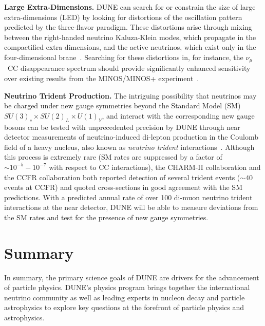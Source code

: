 {\bf Large Extra-Dimensions.}
DUNE can search for or constrain the size of large extra-dimensions (LED) by looking for distortions of the oscillation pattern predicted by the three-flavor paradigm. These distortions arise through mixing between the right-handed neutrino Kaluza-Klein modes, which propagate in the compactified extra dimensions, and the active neutrinos, which exist only in the four-dimensional brane~\cite{Dvali:1999cn}. Searching for these distortions in, for instance, the $\nu_\mu$~CC disappearance spectrum should provide significantly enhanced sensitivity over existing results from the MINOS/MINOS+ experiment~\cite{Adamson:2016yvy}.

{\bf Neutrino Trident Production.}
The intriguing possibility that neutrinos may be charged under new gauge symmetries beyond the Standard Model (SM) $SU(3)_c\times SU(2)_L\times U(1)_Y$, and interact with the corresponding new gauge bosons can be tested with unprecedented precision by DUNE through near detector measurements of neutrino-induced di-lepton production in the Coulomb field of a heavy nucleus, also known as {\it neutrino trident} interactions~\cite{Altmannshofer:2014pba}. Although this process is extremely rare (SM rates are suppressed by a factor of $\sim 10^{-5}-10^{-7}$ with respect to CC interactions), the CHARM-II collaboration \cite{Geiregat:1990gz} and the CCFR collaboration \cite{Mishra:1991bv} both reported detection of several trident events ($\sim 40$ events at CCFR) and quoted cross-sections in good agreement with the SM predictions. With a predicted annual rate of over 100 di-muon neutrino trident interactions at the near detector, DUNE will be able to measure deviations from the SM rates and test for the presence of new gauge symmetries.



\section{Summary}

In summary, the primary science goals of DUNE are drivers for the
advancement of particle physics. DUNE's physics program brings together the 
international neutrino community as well as leading experts in nucleon decay
and particle astrophysics to explore key questions at the forefront of
particle physics and astrophysics.

